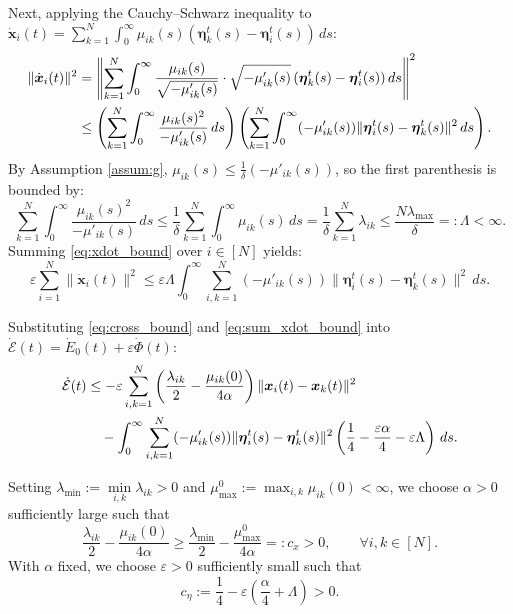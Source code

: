 \documentclass[11pt]{amsart}
\numberwithin{equation}{section}
\begin{document}
Next, applying the Cauchy--Schwarz inequality to $\dot{\boldsymbol{x}}_i(t) = \sum\limits_{k=1}^N \int_0^\infty \mu_{ik}(s)(\boldsymbol{\eta}_k^t(s)-\boldsymbol{\eta}_i^t(s))\,ds$:
\begin{align}\label{eq:xdot_bound}
\|\dot{\boldsymbol{x}}_i(t)\|^2 &= \left\| \sum_{k=1}^N \int_0^\infty \frac{\mu_{ik}(s)}{\sqrt{-\mu'_{ik}(s)}} \cdot \sqrt{-\mu'_{ik}(s)}\, (\boldsymbol{\eta}_k^t(s)-\boldsymbol{\eta}_i^t(s))\,ds \right\|^2 \notag \\
&\le \left(\sum_{k=1}^N \int_0^\infty \frac{\mu_{ik}(s)^2}{-\mu'_{ik}(s)}\,ds\right) \left(\sum_{k=1}^N \int_0^\infty (-\mu'_{ik}(s))\|\boldsymbol{\eta}_i^t(s)-\boldsymbol{\eta}_k^t(s)\|^2\,ds\right).
\end{align}
By Assumption \ref{assum:g}, $\mu_{ik}(s) \le \frac{1}{\delta}(-\mu'_{ik}(s))$, so the first parenthesis is bounded by:
\begin{equation*}
\sum_{k=1}^N \int_0^\infty \frac{\mu_{ik}(s)^2}{-\mu'_{ik}(s)}\,ds \le \frac{1}{\delta}\sum_{k=1}^N \int_0^\infty \mu_{ik}(s)\,ds = \frac{1}{\delta}\sum_{k=1}^N \lambda_{ik} \le \frac{N\lambda_{\max}}{\delta} =: \Lambda < \infty.
\end{equation*}
Summing \eqref{eq:xdot_bound} over $i \in [N]$ yields:
\begin{equation}\label{eq:sum_xdot_bound}
\varepsilon \sum_{i=1}^N \|\dot{\boldsymbol{x}}_i(t)\|^2 \le \varepsilon \Lambda \int_0^\infty \sum_{i,k=1}^N (-\mu'_{ik}(s)) \|\boldsymbol{\eta}_i^t(s)-\boldsymbol{\eta}_k^t(s)\|^2\,ds.
\end{equation}

Substituting \eqref{eq:cross_bound} and \eqref{eq:sum_xdot_bound} into $\dot{\mathcal{E}}(t) = \dot{E}_0(t) + \varepsilon \dot{\Phi}(t)$:
\begin{align}\label{eq:E_dot_assembled}
\dot{\mathcal{E}}(t) &\le -\varepsilon \sum_{i,k=1}^N \left( \frac{\lambda_{ik}}{2} - \frac{\mu_{ik}(0)}{4\alpha} \right) \|\boldsymbol{x}_i(t)-\boldsymbol{x}_k(t)\|^2 \notag \\
&\quad - \int_0^\infty \sum_{i,k=1}^N (-\mu'_{ik}(s)) \|\boldsymbol{\eta}_i^t(s)-\boldsymbol{\eta}_k^t(s)\|^2 \left( \frac{1}{4} - \frac{\varepsilon\alpha}{4} - \varepsilon\Lambda \right)\,ds.
\end{align}

Setting $\lambda_{\min} := \min\limits_{i,k}\lambda_{ik} > 0$ and $\mu^0_{\max} := \max_{i,k}\mu_{ik}(0) < \infty$, we choose $\alpha > 0$ sufficiently large such that
\begin{equation*}
\frac{\lambda_{ik}}{2} - \frac{\mu_{ik}(0)}{4\alpha} \ge \frac{\lambda_{\min}}{2} - \frac{\mu^0_{\max}}{4\alpha} =: c_x > 0, \qquad \forall i,k \in [N].
\end{equation*}
With $\alpha$ fixed, we choose $\varepsilon > 0$ sufficiently small such that
\begin{equation*}
c_\eta := \frac{1}{4} - \varepsilon\left( \frac{\alpha}{4} + \Lambda \right) > 0.
\end{equation*}
\end{document}

